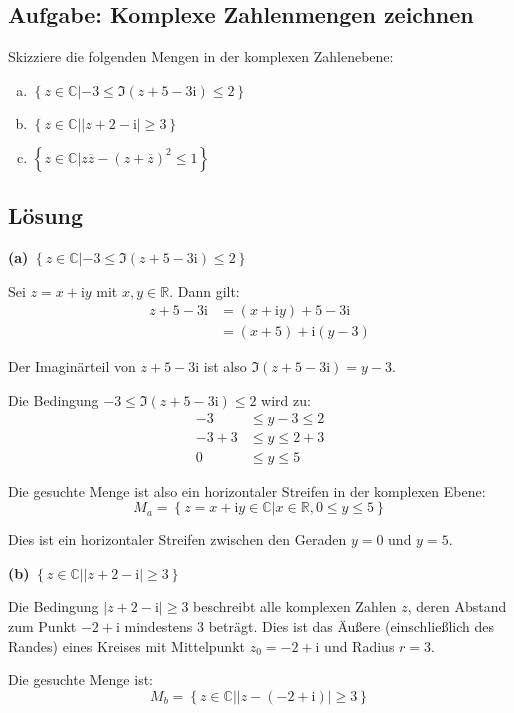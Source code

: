 \documentclass{article}
\newcommand{\C}{\mathbb{C}}
\newcommand{\im}{\mathrm{i}}
\newcommand{\Set}[1]{\left\{#1\right\}}
\newcommand{\abs}[1]{\left|#1\right|}
\newcommand{\conj}[1]{\overline{#1}}
\begin{document}
\subsection*{Aufgabe: Komplexe Zahlenmengen zeichnen}
Skizziere die folgenden Mengen in der komplexen Zahlenebene:
\begin{enumerate}[(a)]
\item $\Set{ z \in \C | -3 \leq \Im(z+5-3\im) \leq 2 }$
\item $\Set{ z \in \C | \abs{z + 2 - \im} \geq 3 }$
\item $\Set{ z \in \C | z \conj{z} - (z + \conj{z} )^2 \leq 1 }$
\end{enumerate}

\subsection*{Lösung}

\textbf{(a)} $\Set{ z \in \C | -3 \leq \Im(z+5-3\im) \leq 2 }$

Sei $z = x + \im y$ mit $x, y \in \mathbb{R}$. Dann gilt:
\begin{align}
z + 5 - 3\im &= (x + \im y) + 5 - 3\im\\
&= (x + 5) + \im(y - 3)
\end{align}

Der Imaginärteil von $z + 5 - 3\im$ ist also $\Im(z + 5 - 3\im) = y - 3$.

Die Bedingung $-3 \leq \Im(z+5-3\im) \leq 2$ wird zu:
\begin{align}
-3 &\leq y - 3 \leq 2\\
-3 + 3 &\leq y \leq 2 + 3\\
0 &\leq y \leq 5
\end{align}

Die gesuchte Menge ist also ein horizontaler Streifen in der komplexen Ebene:
$$M_a = \Set{z = x + \im y \in \C | x \in \mathbb{R}, 0 \leq y \leq 5}$$

Dies ist ein horizontaler Streifen zwischen den Geraden $y = 0$ und $y = 5$.

\textbf{(b)} $\Set{ z \in \C | \abs{z + 2 - \im} \geq 3 }$

Die Bedingung $\abs{z + 2 - \im} \geq 3$ beschreibt alle komplexen Zahlen $z$, deren Abstand zum Punkt $-2 + \im$ mindestens 3 beträgt. Dies ist das Äußere (einschließlich des Randes) eines Kreises mit Mittelpunkt $z_0 = -2 + \im$ und Radius $r = 3$.

Die gesuchte Menge ist:
$$M_b = \Set{z \in \C | \abs{z - (-2 + \im)} \geq 3}$$
\end{document}

